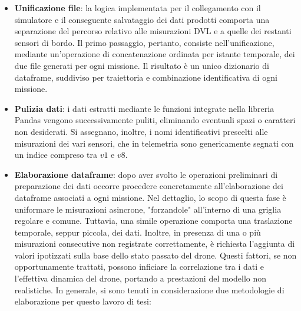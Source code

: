 \begin{itemize}

    \item \textbf{Unificazione file}: la logica implementata per il collegamento con il simulatore e il conseguente salvataggio dei dati prodotti comporta una separazione del percorso relativo alle misurazioni DVL e a quelle dei restanti sensori di bordo. Il primo passaggio, pertanto, consiste nell'unificazione, mediante un'operazione di concatenazione ordinata per istante temporale, dei due file generati per ogni missione. Il risultato è un unico dizionario di dataframe, suddiviso per traiettoria e combinazione identificativa di ogni missione. 

    \item \textbf{Pulizia dati}: i dati estratti mediante le funzioni integrate nella libreria Pandas vengono successivamente puliti, eliminando eventuali spazi o caratteri non desiderati. Si assegnano, inoltre, i nomi identificativi prescelti alle misurazioni dei vari sensori, che in telemetria sono genericamente segnati con un indice compreso tra $v1$ e $v8$.

    \item \textbf{Elaborazione dataframe}: dopo aver svolto le operazioni preliminari di preparazione dei dati occorre procedere concretamente all'elaborazione dei dataframe associati a ogni missione. Nel dettaglio, lo scopo di questa fase è uniformare le misurazioni asincrone, "forzandole" all'interno di una griglia regolare e comune. Tuttavia, una simile operazione comporta una traslazione temporale, seppur piccola, dei dati. Inoltre, in presenza di una o più misurazioni consecutive non registrate correttamente, è richiesta l'aggiunta di valori ipotizzati sulla base dello stato passato del drone. Questi fattori, se non opportunamente trattati, possono inficiare la correlazione tra i dati e l'effettiva dinamica del drone, portando a prestazioni del modello non realistiche. In generale, si sono tenuti in considerazione due metodologie di elaborazione per questo lavoro di tesi:
    
        \begin{itemize}


\end{itemize}
\end{itemize}

